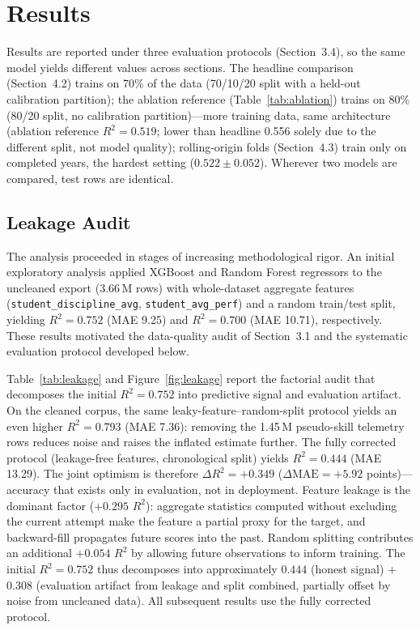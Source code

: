 \documentclass[11pt]{article}
\begin{document}
\section{Results}

Results are reported under three evaluation protocols (Section~3.4), so the same model
yields different values across sections.
The headline comparison (Section~4.2) trains on 70\% of the data (70/10/20 split with a held-out calibration partition); the ablation reference
(Table~\ref{tab:ablation}) trains on 80\% (80/20 split, no calibration partition)---more training data, same architecture (ablation reference $R^{2}=0.519$; lower than headline 0.556 solely due to the different split, not model quality);
rolling-origin folds (Section~4.3) train only on completed years, the hardest setting
($0.522 \pm 0.052$).
Wherever two models are compared, test rows are identical.

\subsection{Leakage Audit}

The analysis proceeded in stages of increasing methodological rigor.
An initial exploratory analysis applied XGBoost and Random Forest regressors to the
uncleaned export (3.66\,M rows) with whole-dataset aggregate features
(\texttt{student\_discipline\_avg}, \texttt{student\_avg\_perf}) and a random
train/test split, yielding $R^{2} = 0.752$ (MAE 9.25) and $R^{2} = 0.700$
(MAE 10.71), respectively.
These results motivated the data-quality audit of Section~3.1 and the systematic
evaluation protocol developed below.

Table~\ref{tab:leakage} and Figure~\ref{fig:leakage} report the factorial audit
that decomposes the initial $R^{2} = 0.752$ into predictive signal and
evaluation artifact.
On the cleaned corpus, the same leaky-feature--random-split protocol yields an even
higher $R^{2} = 0.793$ (MAE 7.36): removing the 1.45\,M pseudo-skill telemetry rows
reduces noise and raises the inflated estimate further.
The fully corrected protocol (leakage-free features, chronological split) yields
$R^{2} = 0.444$ (MAE 13.29).
The joint optimism is therefore $\Delta R^{2} = +0.349$
($\Delta\text{MAE} = +5.92$ points)---accuracy that exists only in evaluation, not in
deployment.
Feature leakage is the dominant factor ($+0.295$ $R^{2}$): aggregate statistics computed
without excluding the current attempt make the feature a partial proxy for the target,
and backward-fill propagates future scores into the past.
Random splitting contributes an additional $+0.054$ $R^{2}$ by allowing future
observations to inform training.
The initial $R^{2} = 0.752$ thus decomposes into approximately $0.444$ (honest signal)
$+$ $0.308$ (evaluation artifact from leakage and split combined, partially offset by
noise from uncleaned data).
All subsequent results use the fully corrected protocol.
\end{document}
